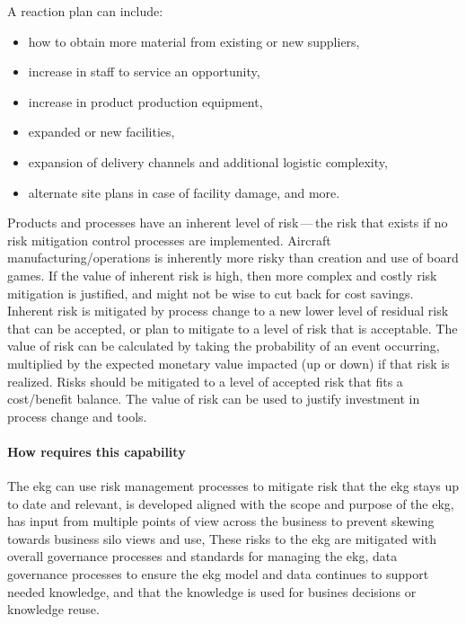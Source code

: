 A reaction plan can include:
\begin{itemize}
    \item how to obtain more material from existing or new suppliers,
    \item increase in staff to service an opportunity,
    \item increase in product production equipment,
    \item expanded or new facilities,
    \item expansion of delivery channels and additional logistic complexity,
    \item alternate site plans in case of facility damage, and more.
\end{itemize}

Products and processes have an inherent level of risk\,---\,the risk that exists if no risk mitigation control
processes are implemented.
Aircraft manufacturing/operations is inherently more risky than creation and use of board games.
If the value of inherent risk is high, then more complex and costly risk mitigation is justified,
and might not be wise to cut back for cost savings.
Inherent risk is mitigated by process change to a new lower level of residual risk that can be accepted,
or plan to mitigate to a level of risk that is acceptable.
The value of risk can be calculated by taking the probability of an event occurring,
multiplied by the expected monetary value impacted (up or down) if that risk is realized.
Risks should be mitigated to a level of accepted risk that fits a cost/benefit balance.
The value of risk can be used to justify investment in process change and tools.

\ekgmmContextSection

\paragraph*{How  requires this capability}

The \gls{ekg} can use risk management processes to mitigate risk that the \gls{ekg} stays up to date and relevant,
is developed aligned with the scope and purpose of the \gls{ekg}, has input from multiple points of view
across the business to prevent skewing towards business silo views and use,
These risks to the \gls{ekg} are mitigated with overall governance processes and standards for managing the \gls{ekg},
data governance processes to ensure the \gls{ekg} model and data continues to support needed knowledge,
and that the knowledge is used for busines decisions or knowledge reuse.

